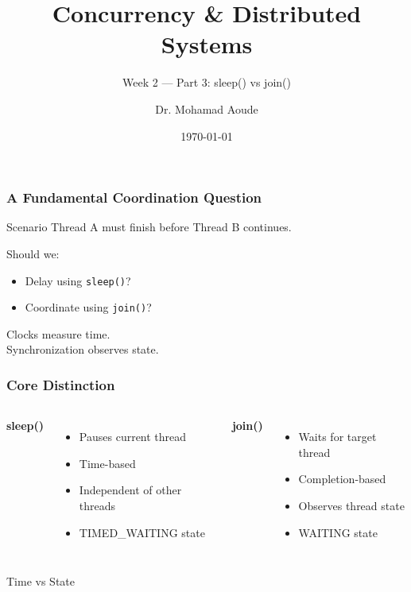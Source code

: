 \documentclass[aspectratio=169,11pt]{beamer}
\title{Concurrency \& Distributed Systems}
\subtitle{Week 2 --- Part 3: sleep() vs join()}
\author{Dr. Mohamad Aoude}
\institute{Lebanese University \\ Faculty of Engineering}
\date{\today}
\begin{document}
	
	\begin{frame}
		\titlepage
	\end{frame}
	
	\begin{frame}
		\frametitle{A Fundamental Coordination Question}
		
		\begin{block}{Scenario}
			Thread A must finish before Thread B continues.
		\end{block}
		
		\vspace{5mm}
		
		Should we:
		\begin{itemize}
			\item Delay using \texttt{sleep()}?
			\item Coordinate using \texttt{join()}?
		\end{itemize}
		
		\vspace{6mm}
		
		\begin{center}
			\Large
			Clocks measure time. \\[2mm]
			Synchronization observes state.
		\end{center}
		
	\end{frame}
	
	\begin{frame}
		\frametitle{Core Distinction}
		
		\begin{columns}
			
			\column{0.48\textwidth}
			\textbf{sleep()}
			
			\begin{itemize}
				\item Pauses current thread
				\item Time-based
				\item Independent of other threads
				\item TIMED\_WAITING state
			\end{itemize}
			
			\column{0.48\textwidth}
			\textbf{join()}
			
			\begin{itemize}
				\item Waits for target thread
				\item Completion-based
				\item Observes thread state
				\item WAITING state
			\end{itemize}
			
		\end{columns}
		
		\vspace{5mm}
		
		\begin{center}
			\Large
			Time vs State
		\end{center}
		
	\end{frame}
	
\end{document}
